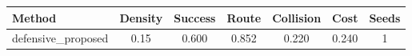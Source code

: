 \begin{tabular}{lcccccc}
\toprule
Method & Density & Success & Route & Collision & Cost & Seeds \\ 
\midrule
defensive_proposed & 0.15 & 0.600 & 0.852 & 0.220 & 0.240 & 1 \\ 
\bottomrule
\end{tabular}
